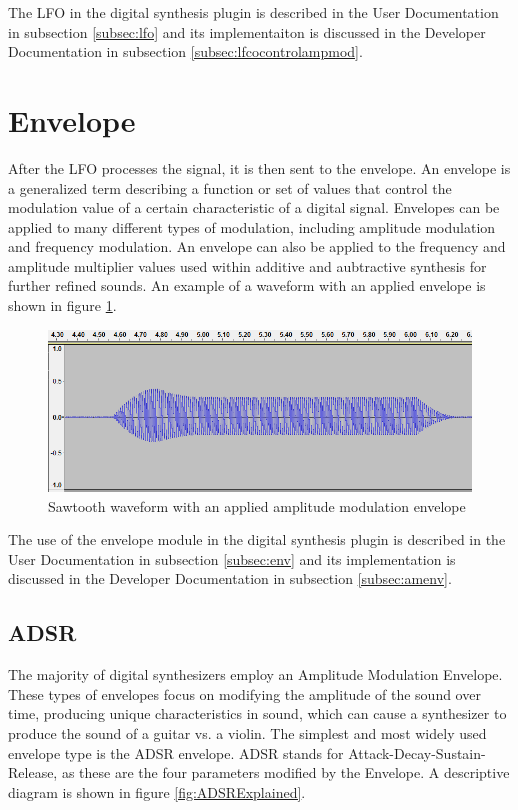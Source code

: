 \documentclass[a4paper,12pt]{report}
\begin{document}
The LFO in the digital synthesis plugin is described in the User Documentation in subsection \ref{subsec:lfo} and its implementaiton is discussed in the Developer Documentation in subsection \ref{subsec:lfcocontrolampmod}.

\section{Envelope}
\label{sec:env}
After the LFO processes the signal, it is then sent to the envelope. An envelope is a generalized term describing a function or set of values that control the modulation value of a certain characteristic of a digital signal. Envelopes can be applied to many different types of modulation, including amplitude modulation and frequency modulation. An envelope can also be applied to the frequency and amplitude multiplier values used within additive and aubtractive synthesis for further refined sounds. An example of a waveform with an applied envelope is shown in figure \ref{fig:ADSRWaveform}.

\begin{figure}[h]
    \centering
    \includegraphics[width=36em]{ADSRWaveform.png}
    \caption{Sawtooth waveform with an applied amplitude modulation envelope}
    \label{fig:ADSRWaveform}
\end{figure}

The use of the envelope module in the digital synthesis plugin is described in the User Documentation in subsection \ref{subsec:env} and its implementation is discussed in the Developer Documentation in subsection \ref{subsec:amenv}.

\subsection{ADSR}
\label{subsec:adsr}
The majority of digital synthesizers employ an Amplitude Modulation Envelope. These types of envelopes focus on modifying the amplitude of the sound over time, producing unique characteristics in sound, which can cause a synthesizer to produce the sound of a guitar vs. a violin. The simplest and most widely used envelope type is the ADSR envelope. ADSR stands for Attack-Decay-Sustain-Release, as these are the four parameters modified by the Envelope. A descriptive diagram is shown in figure \ref{fig:ADSRExplained}.
\end{document}

